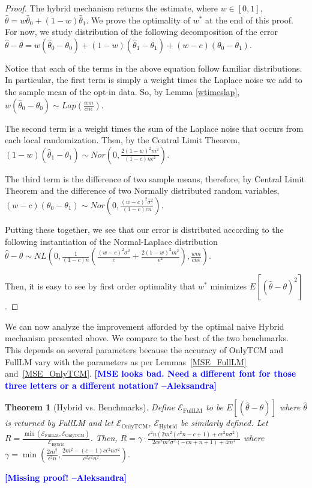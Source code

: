 \documentclass{article}
\newcommand{\ak}[1]{\textcolor{blue}{\bf\small [#1 --Aleksandra]}}
\theoremstyle{plain}
\newtheorem{thm}{Theorem}[section]
\begin{document}
\begin{proof}
The hybrid mechanism returns the estimate, where $w \in [0,1]$,
$\hat{\theta} = w\hat{\theta}_0 + (1-w)\hat{\theta}_1.$
We prove the optimality of $w^*$ at the end of this proof. For now, we study distribution of the following decomposition of the error
$\hat{\theta} - \theta = w(\hat{\theta}_0 - \theta_0) + (1-w)(\hat{\theta}_1 - \theta_1) + (w-c)(\theta_0 - \theta_1).$

Notice that each of the terms in the above equation follow familiar distributions. In particular, the first term is simply a weight times the Laplace noise we add to the sample mean of the opt-in data. So, by Lemma \ref{wtimeslap},
$w(\hat{\theta}_0 - \theta_0) \sim Lap\left(\frac{wm}{cn\epsilon}\right).$

The second term is a weight times the sum of the Laplace noise that occurs from each local randomization. Then, by the Central Limit Theorem,
$(1-w)(\hat{\theta}_1 - \theta_1) \sim Nor\left(0, \frac{2(1-w)^2 m^2}{(1-c)n\epsilon^2}\right).$

The third term is the difference of two sample means, therefore, by Central Limit Theorem and the difference of two Normally distributed random variables, 
$(w-c)(\theta_0 - \theta_1) \sim Nor\left(0, \frac{(w-c)^2\sigma^2}{(1-c)cn}\right).$

Putting these together, we see that our error is distributed according to the following instantiation of the Normal-Laplace distribution
$\hat{\theta} - \theta \sim NL\left(0, \frac{1}{(1-c)n}\left(\frac{(w-c)^2\sigma^2}{c} + \frac{2(1-w)^2 m^2}{\epsilon^2}\right), \frac{wm}{cn\epsilon}\right).$

Then, it is easy to see by first order optimality that $w^*$ minimizes $E[(\hat{\theta} - \theta)^2]$.
\end{proof}

We can now analyze the improvement afforded by the optimal naive Hybrid mechanism presented above. We compare to the best of the two benchmarks. This depends on several parameters because the accuracy of OnlyTCM and FullLM vary with the parameters as per Lemmas~\ref{MSE_FullLM} and~\ref{MSE_OnlyTCM}. 
\ak{MSE looks bad. Need a different font for those three letters or a different notation?}
\begin{thm}[Hybrid vs. Benchmarks]\label{thm:main}
Define $\mathcal{E}_{\text{FullLM}}$ to be $E[(\hat{\theta} - \theta)]$ where $\hat{\theta}$ is returned by FullLM and let $\mathcal{E}_{\text{OnlyTCM}}$, $\mathcal{E}_{\text{Hybrid}}$ be similarly defined.
Let 
$R = \frac{\min(\mathcal{E}_{\text{FullLM}}, \mathcal{E}_{\text{OnlyTCM}})}{\mathcal{E}_{\text{Hybrid}}}$.
Then, 
$R = \gamma \cdot \frac{\epsilon^2 n \left(2 m^2 \left(c^2 n-c+1\right)+c \epsilon^2 n \sigma^2\right)}{2 c \epsilon^2 m^2 \sigma^2 (-c n+n+1)+4 m^4}$
where 
$\gamma = \min \left(\frac{2 m^2}{\epsilon^2 n},\frac{2 m^2-(c-1) c \epsilon^2 n \sigma^2}{c^2 \epsilon^2 n^2}\right).$
\end{thm}
\ak{Missing proof!}
\end{document}
